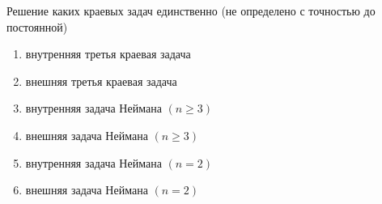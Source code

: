 Решение каких краевых задач единственно (не определено с точностью до постоянной)

\begin{enumerate}[label=\arabic*)]
    \item внутренняя третья краевая задача
    \item внешняя третья краевая задача
    \item внутренняя задача Неймана \((n \geq 3)\)
    \item внешняя задача Неймана \((n \geq 3)\)
    \item внутренняя задача Неймана \((n = 2)\)
    \item внешняя задача Неймана \((n = 2)\)
\end{enumerate}

